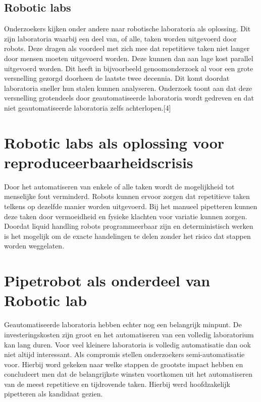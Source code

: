 \subsection{Robotic labs}
Onderzoekers kijken onder andere naar robotische laboratoria als oplossing. Dit zijn laboratoria waarbij een deel van, of alle, taken worden uitgevoerd door robots. Deze dragen als voordeel met zich mee dat repetitieve taken niet langer door mensen moeten uitgevoerd worden. Deze kunnen dan aan lage kost parallel uitgevoerd worden. Dit heeft in bijvoorbeeld genoomonderzoek al voor een grote versnelling gezorgd doorheen de laatste twee decennia. Dit komt doordat laboratoria sneller hun stalen kunnen analyseren. Onderzoek toont aan dat deze versnelling grotendeels door geautomatiseerde laboratoria wordt gedreven en dat niet geautomatiseerde laboratoria zelfs achterlopen.[4]

\section{Robotic labs als oplossing voor reproduceerbaarheidscrisis}
Door het automatiseren van enkele of alle taken wordt de mogelijkheid tot menselijke fout verminderd. Robots kunnen ervoor zorgen dat repetitieve taken telkens op dezelfde manier worden uitgevoerd. Bij het manueel pipetteren kunnen deze taken door vermoeidheid en fysieke klachten voor variatie kunnen zorgen.\ \cite{RN9} Doordat liquid handling robots programmeerbaar zijn en deterministisch werken is het mogelijk om de exacte handelingen te delen zonder het risico dat stappen worden weggelaten.

\section{Pipetrobot als onderdeel van Robotic lab}
Geautomatiseerde laboratoria hebben echter nog een belangrijk minpunt. De investeringskosten zijn groot en het automatiseren van een volledig laboratorium kan lang duren. 
Voor veel kleinere laboratoria is volledig automatisatie dan ook niet altijd interessant. Als compromis stellen onderzoekers semi-automatisatie voor. Hierbij word gekeken naar welke stappen de grootste impact hebben en concludeert men dat de belangrijkste winsten voortkomen uit het automatiseren van de meest repetitieve en tijdrovende taken. Hierbij werd hoofdzakelijk pipetteren als kandidaat gezien.\cite{RN11,RN7}

